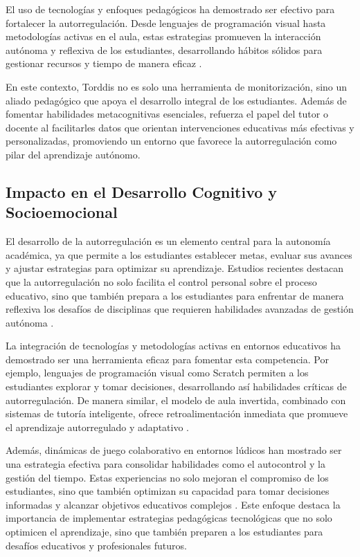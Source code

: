 \documentclass[a4paper,fleqn]{cas-sc}
\begin{document}
			El uso de tecnologías y enfoques pedagógicos ha demostrado ser efectivo para fortalecer la autorregulación. Desde lenguajes de programación visual hasta metodologías activas en el aula, estas estrategias promueven la interacción autónoma y reflexiva de los estudiantes, desarrollando hábitos sólidos para gestionar recursos y tiempo de manera eficaz \citep{SaezLopez2016Visual,Mohamed2018Implementing,Palioura2025Storylling}.
		
			En este contexto, Torddis no es solo una herramienta de monitorización, sino un aliado pedagógico que apoya el desarrollo integral de los estudiantes. Además de fomentar habilidades metacognitivas esenciales, refuerza el papel del tutor o docente al facilitarles datos que orientan intervenciones educativas más efectivas y personalizadas, promoviendo un entorno que favorece la autorregulación como pilar del aprendizaje autónomo.
		
		\subsection{Impacto en el Desarrollo Cognitivo y Socioemocional}
			El desarrollo de la autorregulación es un elemento central para la autonomía académica, ya que permite a los estudiantes establecer metas, evaluar sus avances y ajustar estrategias para optimizar su aprendizaje. Estudios recientes destacan que la autorregulación no solo facilita el control personal sobre el proceso educativo, sino que también prepara a los estudiantes para enfrentar de manera reflexiva los desafíos de disciplinas que requieren habilidades avanzadas de gestión autónoma \citep{Taber2024Developing}.
		
			La integración de tecnologías y metodologías activas en entornos educativos ha demostrado ser una herramienta eficaz para fomentar esta competencia. Por ejemplo, lenguajes de programación visual como Scratch permiten a los estudiantes explorar y tomar decisiones, desarrollando así habilidades críticas de autorregulación. De manera similar, el modelo de aula invertida, combinado con sistemas de tutoría inteligente, ofrece retroalimentación inmediata que promueve el aprendizaje autorregulado y adaptativo \citep{Mohamed2018Implementing}.
		
			Además, dinámicas de juego colaborativo en entornos lúdicos han mostrado ser una estrategia efectiva para consolidar habilidades como el autocontrol y la gestión del tiempo. Estas experiencias no solo mejoran el compromiso de los estudiantes, sino que también optimizan su capacidad para tomar decisiones informadas y alcanzar objetivos educativos complejos \citep{Echeverria2011AFramework}. Este enfoque destaca la importancia de implementar estrategias pedagógicas tecnológicas que no solo optimicen el aprendizaje, sino que también preparen a los estudiantes para desafíos educativos y profesionales futuros.
		
\end{document}
